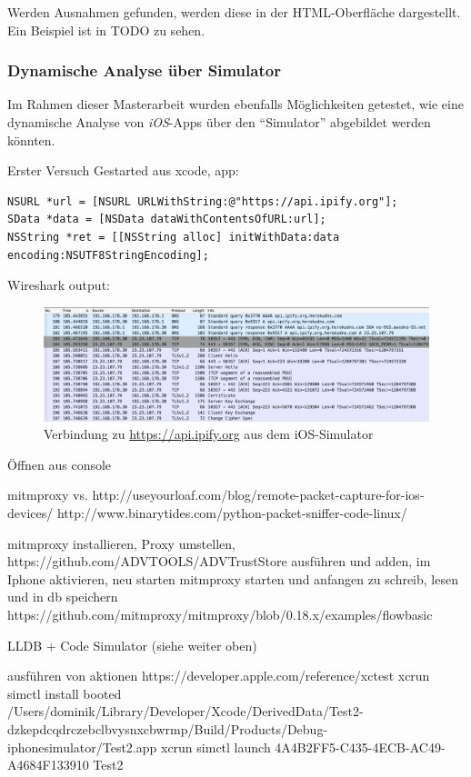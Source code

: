 Werden Ausnahmen gefunden, werden diese in der HTML-Oberfläche dargestellt. Ein Beispiel ist in TODO zu sehen.


\subsubsection{Dynamische Analyse über Simulator}
Im Rahmen dieser Masterarbeit wurden ebenfalls Möglichkeiten getestet, wie eine dynamische Analyse von \textit{iOS}-Apps über den "`Simulator"' abgebildet werden könnten.



Erster Versuch
Gestarted aus xcode, app:
\begin{lstlisting}
NSURL *url = [NSURL URLWithString:@"https://api.ipify.org"];
SData *data = [NSData dataWithContentsOfURL:url];
NSString *ret = [[NSString alloc] initWithData:data encoding:NSUTF8StringEncoding];
\end{lstlisting}
Wireshark output:
\begin{figure}[htbp]
	\centering
	\includegraphics[width=\textwidth]{bilder/pentest_mobile_anwendungen/weiterentw_mobsf/wireshark_simulator.png}
	\caption{Verbindung zu \url{https://api.ipify.org} aus dem iOS-Simulator}
	\label{fig:VergleichLLDBImages}
\end{figure}

Öffnen aus console

mitmproxy vs. http://useyourloaf.com/blog/remote-packet-capture-for-ios-devices/
http://www.binarytides.com/python-packet-sniffer-code-linux/

mitmproxy installieren, Proxy umstellen, https://github.com/ADVTOOLS/ADVTrustStore ausführen und adden, im Iphone aktivieren, neu starten
mitmproxy starten und anfangen zu schreib, lesen und in db speichern
https://github.com/mitmproxy/mitmproxy/blob/0.18.x/examples/flowbasic

LLDB + Code Simulator (siehe weiter oben)

ausführen von aktionen https://developer.apple.com/reference/xctest
xcrun simctl install booted /Users/dominik/Library/Developer/Xcode/DerivedData/Test2-dzkepdcqdrczebclbvysnxcbwrmp/Build/Products/Debug-iphonesimulator/Test2.app
xcrun simctl launch 4A4B2FF5-C435-4ECB-AC49-A4684F133910 Test2

